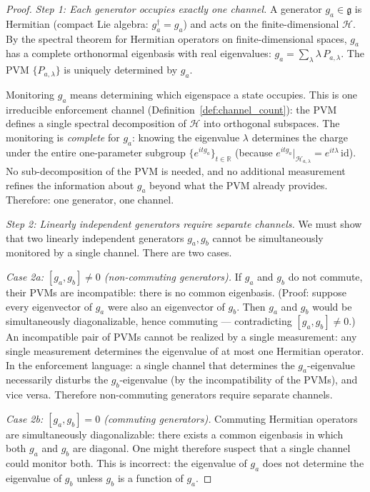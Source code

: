 \documentclass[11pt,a4paper]{article}
\theoremstyle{definition}
\begin{document}
\begin{proof}
\textit{Step 1: Each generator occupies exactly one channel.}\quad
A generator $g_a \in \mathfrak{g}$ is Hermitian (compact Lie algebra:
$g_a^\dagger = g_a$) and acts on the finite-dimensional $\mathcal{H}$.
By the spectral theorem for Hermitian operators on finite-dimensional
spaces, $g_a$ has a complete orthonormal eigenbasis with real
eigenvalues: $g_a = \sum_\lambda \lambda\, P_{a,\lambda}$.  The
PVM $\{P_{a,\lambda}\}$ is uniquely determined by $g_a$.

Monitoring $g_a$ means determining which eigenspace a state occupies.
This is one irreducible enforcement channel
(Definition~\ref{def:channel_count}): the PVM defines a single
spectral decomposition of $\mathcal{H}$ into orthogonal subspaces.
The monitoring is \emph{complete} for $g_a$: knowing the eigenvalue
$\lambda$ determines the charge under the entire one-parameter
subgroup $\{e^{it g_a}\}_{t \in \mathbb{R}}$ (because
$e^{it g_a}|_{\mathcal{H}_{a,\lambda}} = e^{it\lambda}\,\mathrm{id}$).
No sub-decomposition of the PVM is needed, and no additional
measurement refines the information about $g_a$ beyond what the PVM
already provides.  Therefore: one generator, one channel.

\textit{Step 2: Linearly independent generators require separate
channels.}\quad
We must show that two linearly independent generators $g_a, g_b$
cannot be simultaneously monitored by a single channel.  There are
two cases.

\textit{Case 2a: $[g_a, g_b] \ne 0$ (non-commuting generators).}\quad
If $g_a$ and $g_b$ do not commute, their PVMs are incompatible: there
is no common eigenbasis.  (Proof: suppose every eigenvector of $g_a$
were also an eigenvector of $g_b$.  Then $g_a$ and $g_b$ would be
simultaneously diagonalizable, hence commuting --- contradicting
$[g_a, g_b] \ne 0$.)  An incompatible pair of PVMs cannot be realized
by a single measurement: any single measurement determines the
eigenvalue of at most one Hermitian operator.  In the enforcement
language: a single channel that determines the $g_a$-eigenvalue
necessarily disturbs the $g_b$-eigenvalue (by the incompatibility of
the PVMs), and vice versa.  Therefore non-commuting generators
require separate channels.

\textit{Case 2b: $[g_a, g_b] = 0$ (commuting generators).}\quad
Commuting Hermitian operators are simultaneously diagonalizable:
there exists a common eigenbasis in which both $g_a$ and $g_b$ are
diagonal.  One might therefore suspect that a single channel could
monitor both.  This is incorrect: the eigenvalue of $g_a$ does not
determine the eigenvalue of $g_b$ unless $g_b$ is a function of $g_a$.


\end{proof}
\end{document}
